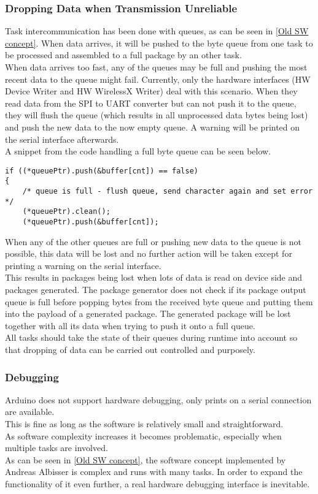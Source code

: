 \subsubsection{Dropping Data when Transmission Unreliable}
Task intercommunication has been done with queues, as can be seen in \autoref{Old SW concept}. When data arrives, it will be pushed to the byte queue from one task to be processed and assembled to a full package by an other task. \\
When data arrives too fast, any of the queues may be full and pushing the most recent data to the queue might fail. Currently, only the hardware interfaces (HW Device Writer and HW WirelessX Writer) deal with this scenario. When they read data from the SPI to UART converter but can not push it to the queue, they will flush the queue (which results in all unprocessed data bytes being lost) and push the new data to the now empty queue. A warning will be printed on the serial interface afterwards. \\
A snippet from the code handling a full byte queue can be seen below.\\
\begin{lstlisting}
if ((*queuePtr).push(&buffer[cnt]) == false)
{
    /* queue is full - flush queue, send character again and set error */
    (*queuePtr).clean();
    (*queuePtr).push(&buffer[cnt]);
\end{lstlisting}
When any of the other queues are full or pushing new data to the queue is not possible, this data will be lost and no further action will be taken except for printing a warning on the serial interface.\\
This results in packages being lost when lots of data is read on device side and packages generated. The package generator does not check if its package output queue is full before popping bytes from the received byte queue and putting them into the payload of a generated package. The generated package will be lost together with all its data when trying to push it onto a full queue. \\
All tasks should take the state of their queues during runtime into account so that dropping of data can be carried out controlled and purposely.\\
%
\subsubsection{Debugging}
Arduino does not support hardware debugging, only prints on a serial connection are available.\\
This is fine as long as the software is relatively small and straightforward.\\
As software complexity increases it becomes problematic, especially when multiple tasks are involved.\\
As can be seen in \autoref{Old SW concept}, the software concept implemented by Andreas Albisser is complex and runs with many tasks. In order to expand the functionality of it even further, a real hardware debugging interface is inevitable.\\
%
